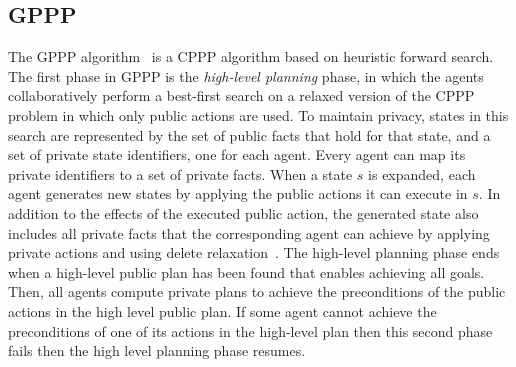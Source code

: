 \documentclass[letterpaper]{article}
\theoremstyle{definition}
\begin{document}
\subsection{GPPP}


The GPPP algorithm~\citep{maliah2016collaborative} is a CPPP algorithm based on heuristic forward search. %
The first phase in GPPP is the {\em high-level planning} phase, in which the agents collaboratively perform a best-first search on a relaxed version of the CPPP problem in which only public actions are used. To maintain privacy, states in this search are represented by the set of public facts that hold for that state, and a set of private state identifiers, one for each agent. Every agent can map its private identifiers to a set of private facts.
When a state $s$ is expanded, each agent generates new states by applying the public actions it can execute in $s$. In addition to the effects of the executed public action, the generated state also includes all private facts that the corresponding agent can achieve by applying private actions and using delete relaxation~\citep{hoffmann2001ff}.
The high-level planning phase ends when a high-level public plan has been found that enables achieving all goals. Then, all agents compute private plans to achieve the preconditions of the public actions in the high level public plan. If some agent cannot achieve the preconditions of one of its actions in the high-level plan then this second phase fails then the high level planning phase resumes.


\end{document}
